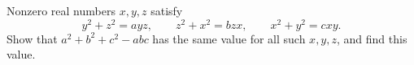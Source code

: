 Nonzero real numbers $x,y,z$ satisfy
\[y^2+z^2=ayz,\qquad z^2+x^2=bzx,\qquad x^2+y^2=cxy.\]
Show that $a^2+b^2+c^2-abc$ has the same value for all such $x,y,z$, and find this value.

